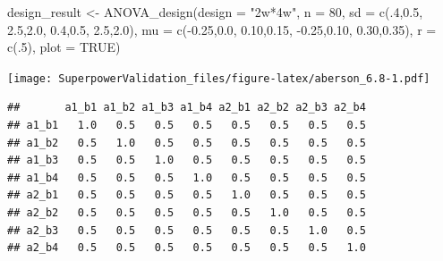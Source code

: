 \documentclass[
]{book}
\newenvironment{Shaded}{\begin{snugshade}}{\end{snugshade}}
\newcommand{\AttributeTok}[1]{\textcolor[rgb]{0.77,0.63,0.00}{#1}}
\newcommand{\ConstantTok}[1]{\textcolor[rgb]{0.00,0.00,0.00}{#1}}
\newcommand{\DecValTok}[1]{\textcolor[rgb]{0.00,0.00,0.81}{#1}}
\newcommand{\FloatTok}[1]{\textcolor[rgb]{0.00,0.00,0.81}{#1}}
\newcommand{\FunctionTok}[1]{\textcolor[rgb]{0.00,0.00,0.00}{#1}}
\newcommand{\NormalTok}[1]{#1}
\newcommand{\OtherTok}[1]{\textcolor[rgb]{0.56,0.35,0.01}{#1}}
\newcommand{\SpecialCharTok}[1]{\textcolor[rgb]{0.00,0.00,0.00}{#1}}
\newcommand{\StringTok}[1]{\textcolor[rgb]{0.31,0.60,0.02}{#1}}
\begin{document}
\begin{Shaded}
\begin{Highlighting}[]
\NormalTok{design\_result }\OtherTok{\textless{}{-}} \FunctionTok{ANOVA\_design}\NormalTok{(}\AttributeTok{design =} \StringTok{"2w*4w"}\NormalTok{,}
                              \AttributeTok{n =} \DecValTok{80}\NormalTok{,}
                              \AttributeTok{sd =} \FunctionTok{c}\NormalTok{(.}\DecValTok{4}\NormalTok{,}\FloatTok{0.5}\NormalTok{, }
                                     \FloatTok{2.5}\NormalTok{,}\FloatTok{2.0}\NormalTok{, }
                                     \FloatTok{0.4}\NormalTok{,}\FloatTok{0.5}\NormalTok{, }
                                     \FloatTok{2.5}\NormalTok{,}\FloatTok{2.0}\NormalTok{),}
                              \AttributeTok{mu =} \FunctionTok{c}\NormalTok{(}\SpecialCharTok{{-}}\FloatTok{0.25}\NormalTok{,}\FloatTok{0.0}\NormalTok{, }
                                     \FloatTok{0.10}\NormalTok{,}\FloatTok{0.15}\NormalTok{, }
                                     \SpecialCharTok{{-}}\FloatTok{0.25}\NormalTok{,}\FloatTok{0.10}\NormalTok{, }
                                     \FloatTok{0.30}\NormalTok{,}\FloatTok{0.35}\NormalTok{),}
                              \AttributeTok{r =} \FunctionTok{c}\NormalTok{(.}\DecValTok{5}\NormalTok{),}
                              \AttributeTok{plot =} \ConstantTok{TRUE}\NormalTok{)}
\end{Highlighting}
\end{Shaded}

\texttt{[image: SuperpowerValidation\_files/figure-latex/aberson\_6.8-1.pdf]}

\begin{Shaded}
\end{Shaded}

\begin{verbatim}
##       a1_b1 a1_b2 a1_b3 a1_b4 a2_b1 a2_b2 a2_b3 a2_b4
## a1_b1   1.0   0.5   0.5   0.5   0.5   0.5   0.5   0.5
## a1_b2   0.5   1.0   0.5   0.5   0.5   0.5   0.5   0.5
## a1_b3   0.5   0.5   1.0   0.5   0.5   0.5   0.5   0.5
## a1_b4   0.5   0.5   0.5   1.0   0.5   0.5   0.5   0.5
## a2_b1   0.5   0.5   0.5   0.5   1.0   0.5   0.5   0.5
## a2_b2   0.5   0.5   0.5   0.5   0.5   1.0   0.5   0.5
## a2_b3   0.5   0.5   0.5   0.5   0.5   0.5   1.0   0.5
## a2_b4   0.5   0.5   0.5   0.5   0.5   0.5   0.5   1.0
\end{verbatim}
\end{document}
